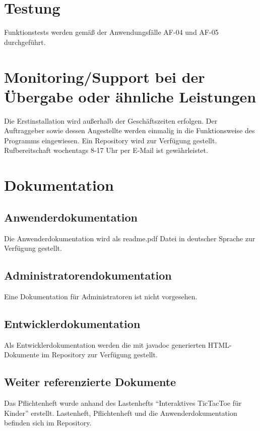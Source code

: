 \documentclass[12pt]{article}
\begin{document}
\section{Testung}
Funktionstests werden gemäß der Anwendungsfälle AF-04 und AF-05 durchgeführt.

\section{Monitoring/Support bei der Übergabe oder ähnliche Leistungen}
Die Erstinstallation wird außerhalb der Geschäftszeiten erfolgen. Der Auftraggeber sowie dessen Angestellte werden einmalig in die Funktionsweise des Programms eingewiesen. Ein \Gls{Repository} wird zur Verfügung gestellt. Rufbereitschaft wochentags 8-17 Uhr per E-Mail ist gewährleistet. 

\section{Dokumentation}
\subsection{Anwenderdokumentation}
Die Anwenderdokumentation wird als readme.pdf Datei in deutscher Sprache zur Verfügung gestellt.
\subsection{Administratorendokumentation}
Eine Dokumentation für Administratoren ist nicht vorgesehen.
\subsection{Entwicklerdokumentation}
Als Entwicklerdokumentation werden die mit javadoc generierten HTML-Dokumente im \Gls{Repository} zur Verfügung gestellt.
\subsection{Weiter referenzierte Dokumente}
Das Pflichtenheft wurde anhand des Lastenhefts "`Interaktives \Gls{TicTacToe} für Kinder"' erstellt. Lastenheft, Pflichtenheft und die Anwenderdokumentation befinden sich im \Gls{Repository}.
\newpage
\end{document}
